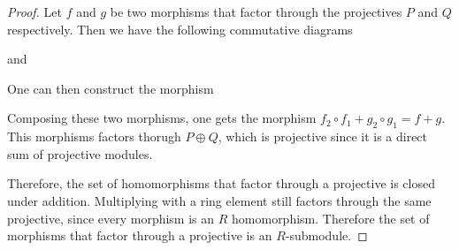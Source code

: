 \begin{proof}
    Let \( f \) and \( g \) be two morphisms that factor through the projectives \( P \) and \( Q \) respectively. Then we have the following commutative diagrams
    \begin{center}
        and
    \end{center}

    One can then construct the morphism
    \begin{center}
    \end{center}

    Composing these two morphisms, one gets the morphism \( f_2 \circ f_1 + g_2 \circ g_1 = f + g \). This morphisms factors thorugh \( P \oplus Q \), which is projective since it is a direct sum of projective modules.

    Therefore, the set of homomorphisms that factor through a projective is closed under addition. Multiplying with a ring element still factors through the same projective, since every morphism is an \( R \) homomorphism. Therefore the set of morphisms that factor through a projective is an \( R \)-submodule.
\end{proof}

